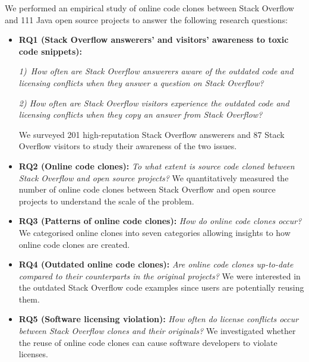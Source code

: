 \documentclass[10pt,journal,compsoc]{IEEEtran}
\begin{document}
We performed an empirical study of online code clones between Stack
Overflow and 111 Java open source projects to answer the following
research questions:
\begin{itemize}
	
	\item \textbf{RQ1 (Stack Overflow answerers' and visitors' awareness to toxic code snippets): }
	
	\textit{1)~How often are Stack Overflow
		answerers aware of the outdated code and licensing conflicts when
		they answer a question on Stack Overflow?} 
	
	\textit{2) How often are Stack Overflow
		visitors experience the outdated code and licensing conflicts when
		they copy an answer from Stack Overflow?} 
	
	We surveyed 201 high-reputation Stack Overflow answerers and 87 Stack Overflow visitors to study their
	awareness of the two issues.

	\item \textbf{RQ2 (Online code clones): }\textit{To what extent is source
		code cloned between Stack Overflow and open source projects?} We
	quantitatively measured the number of online code clones between Stack
	Overflow and open source projects to understand the scale of the
	problem. 
	
	\item \textbf{RQ3 (Patterns of online code clones): }\textit{How do online
		code clones occur?} We categorised online clones into seven
	categories allowing insights to how online code clones are created.
	
	\item \textbf{RQ4 (Outdated online code clones): }\textit{Are
		online code clones up-to-date compared to their counterparts in the
		original projects?} We were interested in the outdated Stack
	Overflow code examples since users are potentially reusing
	them. 
	
	\item \textbf{RQ5 (Software licensing violation): }\textit{How often do
		license conflicts occur between Stack Overflow clones and their
		originals?} We investigated whether the reuse of online code clones
	can cause software developers to violate licenses.
\end{itemize}
\end{document}
